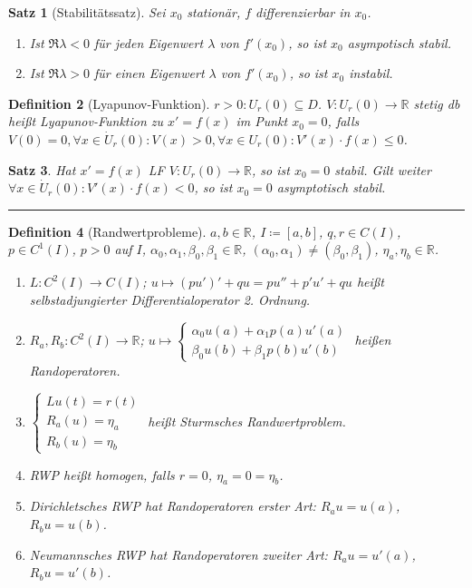 \documentclass[a4paper]{article}
\newcounter{Sec}
\theoremstyle{marginbreak}
\newtheorem{definition}{Definition}[Sec]
\newtheorem{satz}[definition]{Satz}
\newcommand{\sep}{%
	\rule{\textwidth}{0.3pt}%
	\stepcounter{Sec}%
	}
\newcommand{\R}{\mathbb{R}}
\begin{document}
	\begin{satz}[Stabilitätssatz]
		Sei $x_0$ stationär, $f$ differenzierbar in $x_0$.
		\begin{enumerate}[label=(\alph*)]
			\item Ist $\Re\lambda<0$ für \emph{jeden}
				Eigenwert $\lambda$ von $f'(x_0)$, so ist $x_0$ asympotisch stabil.
			\item Ist $\Re\lambda>0$ für \emph{einen} Eigenwert $\lambda$ von $f'(x_0)$, so ist
				$x_0$ instabil.
		\end{enumerate}
	\end{satz}
	\begin{definition}[Lyapunov-Funktion]
		$r>0: U_r(0)\subseteq D$. $V\colon U_r(0)\to\R$ stetig db heißt Lyapunov-Funktion
		zu $x'=f(x)$ im Punkt $x_0=0$, falls $V(0)=0, \forall x\in \dot{U}_r(0): V(x)>0,
		\forall x\in U_r(0): V'(x)\cdot f(x)\leq 0$.
	\end{definition}
	\begin{satz}
		Hat $x'=f(x)$ LF $V\colon U_r(0)\to\R$, so ist $x_0=0$ stabil. Gilt weiter
		$\forall x\in\dot{U}_r(0): V'(x)\cdot f(x)<0$, so ist $x_0=0$ asymptotisch stabil.
	\end{satz}
	\sep
	\begin{definition}[Randwertprobleme]
		$a, b\in\R$, $I\coloneqq [a, b]$, $q, r\in C(I)$, $p\in C^1(I)$, $p>0$ auf $I$,
		$\alpha_0,\alpha_1,\beta_0,\beta_1\in\R$, $(\alpha_0,\alpha_1)\neq(\beta_0,\beta_1)$, $\eta_a,\eta_b\in\R$.
		\begin{enumerate}[label=(\alph*)]
			\item $L\colon C^2(I)\to C(I)$; $u\mapsto (pu')'+qu = pu''+p'u'+qu$ heißt selbstadjungierter
				Differentialoperator 2. Ordnung.
			\item $R_a, R_b\colon C^2(I)\to\R$; $u\mapsto\begin{cases}\alpha_0 u(a)+\alpha_1p(a)u'(a)\\
				\beta_0u(b)+\beta_1p(b)u'(b)\end{cases}$ heißen Randoperatoren.
			\item $\begin{cases}Lu(t)=r(t)\\R_a(u)=\eta_a\\R_b(u)=\eta_b\end{cases}$ heißt
				Sturmsches Randwertproblem.
			\item RWP heißt homogen, falls $r=0$, $\eta_a=0=\eta_b$.
			\item Dirichletsches RWP hat Randoperatoren erster Art: $R_au=u(a)$, $R_bu=u(b)$.
			\item Neumannsches RWP hat Randoperatoren zweiter Art: $R_au=u'(a)$, $R_bu=u'(b)$.
		\end{enumerate}
	\end{definition}
\end{document}
